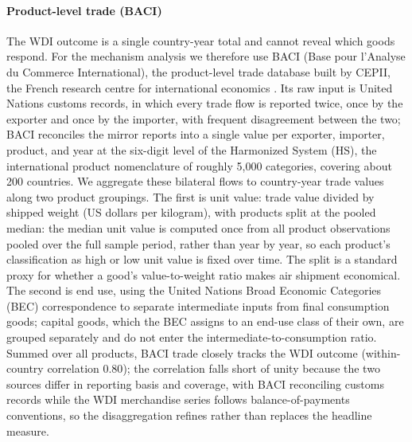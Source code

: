 \paragraph{\textbf{Product-level trade (BACI)}} The WDI outcome is a single
country-year total and cannot reveal which goods respond. For the mechanism
analysis we therefore use BACI (Base pour l'Analyse du Commerce
International), the product-level trade database built by CEPII, the French
research centre for international economics \citep{Gaulier_2010}. Its raw
input is United Nations customs records, in which every trade flow is
reported twice, once by the exporter and once by the importer, with frequent
disagreement between the two; BACI reconciles the mirror reports into a
single value per exporter, importer, product, and year at the six-digit
level of the Harmonized System (HS), the international product nomenclature
of roughly 5{,}000 categories, covering about 200 countries. We aggregate
these bilateral flows to country-year trade values along two product
groupings. The first is unit value: trade value divided by shipped weight
(US dollars per kilogram), with products split at the pooled median: the
median unit value is computed once from all product observations pooled
over the full sample period, rather than year by year, so each product's
classification as high or low unit value is fixed over time. The split is a
standard proxy for whether a good's value-to-weight ratio makes air
shipment economical. The second is end use, using the United Nations Broad
Economic Categories (BEC) correspondence to separate intermediate inputs
from final consumption goods; capital goods, which the BEC assigns to an
end-use class of their own, are grouped separately and do not enter the
intermediate-to-consumption ratio. Summed over all products, BACI trade closely
tracks the WDI outcome (within-country correlation $0.80$); the correlation
falls short of unity because the two sources differ in reporting basis and
coverage, with BACI reconciling customs records while the WDI merchandise
series follows balance-of-payments conventions, so the disaggregation
refines rather than replaces the headline measure.

